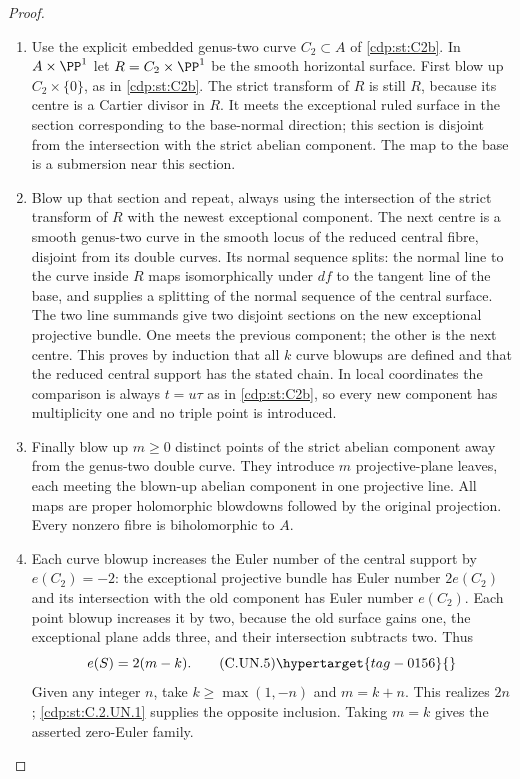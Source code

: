 \begin{proof}

\begin{enumerate}[label=\arabic*.,leftmargin=*]
\item Use the explicit embedded genus-two curve $C_2\subset A$ of \ref{cdp:st:C2b}.
In $A\times\PP^1$ let
$R=C_2\times\PP^1$ be the smooth horizontal surface. First blow up $C_2\times\{0\}$, as in \ref{cdp:st:C2b}.
The strict transform of $R$ is still $R$, because its centre is a
Cartier divisor in $R$. It meets the exceptional ruled surface in
the section corresponding to the base-normal direction; this
section is disjoint from the intersection with the strict abelian
component. The map to the base is a submersion near this section.

\item Blow up that section and repeat, always using the intersection of
the strict transform of $R$ with the newest exceptional component.
The next centre is a smooth genus-two curve in the smooth locus of
the reduced central fibre, disjoint from its double curves. Its
normal sequence splits: the normal line to the curve inside $R$
maps isomorphically under $df$ to the tangent line of the base,
and supplies a splitting of the normal sequence of the central
surface. The two line summands give two disjoint sections on the
new exceptional projective bundle. One meets the previous
component; the other is the next centre. This proves by induction
that all $k$ curve blowups are defined and that the reduced central
support has the stated chain. In local coordinates the comparison
is always $t=u\tau$ as in \ref{cdp:st:C2b}, so every new component has
multiplicity one and no triple point is introduced.

\item Finally blow up $m\ge0$ distinct points of the strict abelian
component away from the genus-two double curve. They introduce
$m$ projective-plane leaves, each meeting the blown-up abelian
component in one projective line. All maps are proper holomorphic
blowdowns followed by the original projection. Every nonzero
fibre is biholomorphic to $A$.

\item Each curve blowup increases the Euler number of the central
support by $e(C_2)=-2$: the exceptional projective bundle has Euler
number $2e(C_2)$ and its intersection with the old component has
Euler number $e(C_2)$. Each point blowup increases it by two,
because the old surface gains one, the exceptional plane adds
three, and their intersection subtracts two. Thus
\[
                         e(S)=2(m-k).                 \tag{C.UN.5}\hypertarget{tag-0156}{}\label{cdp:eq:C.UN.5}
\]
Given any integer $n$, take $k\ge\max(1,-n)$ and $m=k+n$.
This realizes $2n$; \ref{cdp:st:C.2.UN.1} supplies the opposite inclusion.
Taking $m=k$ gives the asserted zero-Euler family.


\end{enumerate}
\end{proof}
